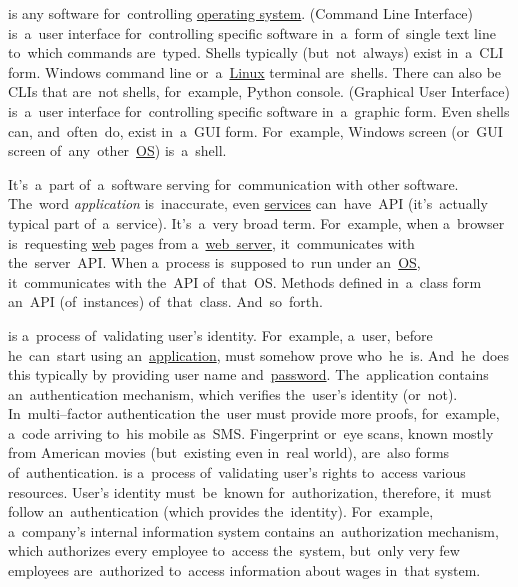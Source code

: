 \label{shellcligui}
\begin{itemize}
     is any software for~controlling \hyperref[os]{operating system}.
     (Command Line Interface) is~a~user interface for~controlling specific software in~a~form of~single text line to~which commands are~typed.
            Shells typically (but~not~always) exist in~a~CLI form.
            Windows command line or~a~\hyperref[linux]{Linux} terminal are~shells.
            There can also be CLIs that are~not shells, for~example, Python console.
     (Graphical User Interface) is~a~user interface for~controlling specific software in~a~graphic form.
            Even shells can, and~often~do, exist in~a~GUI form.
            For~example, Windows screen (or~GUI screen of~any~other~\hyperref[os]{OS}) is~a~shell.
\end{itemize}

\label{api}
It's~a~part of~a~software serving for~communication with other software.
The~word \textit{application} is~inaccurate, even \hyperref[applicationprocessprogramservicethread]{services} can~have~API (it's~actually typical part of~a~service).
It's~a~very broad term.
For~example, when a~browser is~requesting \hyperref[internetweb]{web} pages from a~\hyperref[webserver]{web~server}, it~communicates with the~server~API\@.
When a~process is~supposed to~run under an~\hyperref[os]{OS}, it~communicates with the~API of~that~OS\@.
Methods defined in~a~class form an~API (of~instances) of~that~class.
And~so~forth.

\label{authenticationauthorization}
\begin{itemize}
     is a~process of~validating user's identity.
            For~example, a~user, before he~can~start using an~\hyperref[applicationprocessprogramservicethread]{application}, must somehow prove who~he~is.
            And~he~does this typically by providing user name and~\hyperref[keypassword]{password}.
            The~application contains an~authentication mechanism, which verifies the~user's identity (or~not).
            In~multi--factor authentication the~user must provide more proofs, for~example, a~code arriving to~his mobile as~SMS.
            Fingerprint or~eye scans, known mostly from American movies (but~existing even in~real world), are~also forms of~authentication.
     is a~process of~validating user's rights to~access various resources.
            User's identity must~be~known for~authorization, therefore, it~must follow an~authentication (which provides the~identity).
            For~example, a~company's internal information system contains an~authorization mechanism, which authorizes every employee to~access the~system, but~only very few employees are~authorized to~access information about wages in~that system.
\end{itemize}

